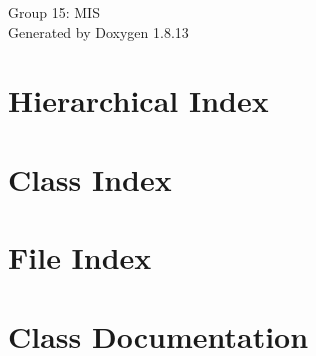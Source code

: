 \documentclass[twoside]{book}
\newcommand{\+}{\discretionary{\mbox{\scriptsize$\hookleftarrow$}}{}{}}
\newcommand{\clearemptydoublepage}{%
  \newpage{\pagestyle{empty}\cleardoublepage}%
}
\begin{document}
\hypersetup{pageanchor=false,
             bookmarksnumbered=true,
             pdfencoding=unicode
            }
\begin{titlepage}
\vspace*{7cm}
\begin{center}%
{\Large Group 15\+: M\+IS }\\
\vspace*{1cm}
{\large Generated by Doxygen 1.8.13}\\
\end{center}
\end{titlepage}
\clearemptydoublepage
{}
\tableofcontents
\clearemptydoublepage
{}
\hypersetup{pageanchor=true}

\chapter{Hierarchical Index}

\chapter{Class Index}

\chapter{File Index}

\chapter{Class Documentation}























\end{document}
